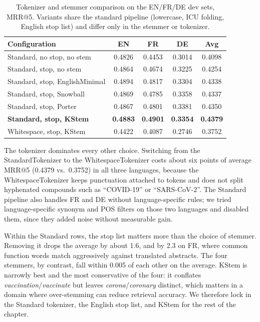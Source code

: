 \begin{table}[!ht]
    \caption{Tokenizer and stemmer comparison on the EN/FR/DE dev sets, MRR@5. Variants share the standard pipeline (lowercase, ICU folding, English stop list) and differ only in the stemmer or tokenizer.}
    \label{tab:stemmer-comparison}
    \centering
    \begin{tabular}{lcccc}
        \toprule
        Configuration & EN & FR & DE & Avg \\
        \midrule
        Standard, no stop, no stem        & 0.4826 & 0.4453 & 0.3014 & 0.4098 \\
        Standard, stop, no stem           & 0.4864 & 0.4674 & 0.3225 & 0.4254 \\
        Standard, stop, EnglishMinimal    & 0.4894 & 0.4817 & 0.3304 & 0.4338 \\
        Standard, stop, Snowball          & 0.4869 & 0.4785 & 0.3358 & 0.4337 \\
        Standard, stop, Porter            & 0.4867 & 0.4801 & 0.3381 & 0.4350 \\
        \textbf{Standard, stop, KStem}    & \textbf{0.4883} & \textbf{0.4901} & \textbf{0.3354} & \textbf{0.4379} \\
        \midrule
        Whitespace, stop, KStem           & 0.4422 & 0.4087 & 0.2746 & 0.3752 \\
        \bottomrule
    \end{tabular}
\end{table}

The tokenizer dominates every other choice. Switching from the StandardTokenizer to the WhitespaceTokenizer costs about six points of average MRR@5 (0.4379 vs.\ 0.3752) in all three languages, because the WhitespaceTokenizer keeps punctuation attached to tokens and does not split hyphenated compounds such as ``COVID-19'' or ``SARS-CoV-2''. The Standard pipeline also handles FR and DE without language-specific rules; we tried language-specific synonym and POS filters on those two languages and disabled them, since they added noise without measurable gain.

Within the Standard rows, the stop list matters more than the choice of stemmer. Removing it drops the average by about 1.6, and by 2.3 on FR, where common function words match aggressively against translated abstracts. The four stemmers, by contrast, fall within 0.005 of each other on the average. KStem is narrowly best and the most conservative of the four: it conflates \emph{vaccination}/\emph{vaccinate} but leaves \emph{corona}/\emph{coronary} distinct, which matters in a domain where over-stemming can reduce retrieval accuracy. We therefore lock in the Standard tokenizer, the English stop list, and KStem for the rest of the chapter.

